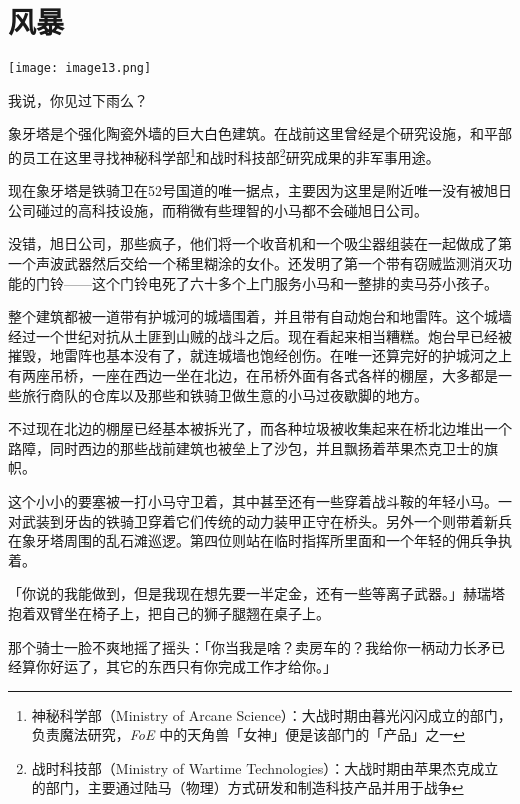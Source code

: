 \chapter{风暴}

\texttt{[image: image13.png]}

\begin{intro}
我说，你见过下雨么？
\end{intro}


象牙塔是个强化陶瓷外墙的巨大白色建筑。在战前这里曾经是个研究设施，和平部的员工在这里寻找神秘科学部\footnote{神秘科学部（Ministry of Arcane Science）：大战时期由暮光闪闪成立的部门，负责魔法研究，\emph{FoE} 中的天角兽「女神」便是该部门的「产品」之一}和战时科技部\footnote{战时科技部（Ministry of Wartime Technologies）：大战时期由苹果杰克成立的部门，主要通过陆马（物理）方式研发和制造科技产品并用于战争}研究成果的非军事用途。

现在象牙塔是铁骑卫在52号国道的唯一据点，主要因为这里是附近唯一没有被旭日公司碰过的高科技设施，而稍微有些理智的小马都不会碰旭日公司。

没错，旭日公司，那些疯子，他们将一个收音机和一个吸尘器组装在一起做成了第一个声波武器然后交给一个稀里糊涂的女仆。还发明了第一个带有窃贼监测消灭功能的门铃——这个门铃电死了六十多个上门服务小马和一整排的卖马芬小孩子。

整个建筑都被一道带有护城河的城墙围着，并且带有自动炮台和地雷阵。这个城墙经过一个世纪对抗从土匪到山贼的战斗之后。现在看起来相当糟糕。炮台早已经被摧毁，地雷阵也基本没有了，就连城墙也饱经创伤。在唯一还算完好的护城河之上有两座吊桥，一座在西边一坐在北边，在吊桥外面有各式各样的棚屋，大多都是一些旅行商队的仓库以及那些和铁骑卫做生意的小马过夜歇脚的地方。

不过现在北边的棚屋已经基本被拆光了，而各种垃圾被收集起来在桥北边堆出一个路障，同时西边的那些战前建筑也被垒上了沙包，并且飘扬着苹果杰克卫士的旗帜。

这个小小的要塞被一打小马守卫着，其中甚至还有一些穿着战斗鞍的年轻小马。一对武装到牙齿的铁骑卫穿着它们传统的动力装甲正守在桥头。另外一个则带着新兵在象牙塔周围的乱石滩巡逻。第四位则站在临时指挥所里面和一个年轻的佣兵争执着。

「你说的我能做到，但是我现在想先要一半定金，还有一些等离子武器。」赫瑞塔抱着双臂坐在椅子上，把自己的狮子腿翘在桌子上。

那个骑士一脸不爽地摇了摇头：「你当我是啥？卖房车的？我给你一柄动力长矛已经算你好运了，其它的东西只有你完成工作才给你。」

